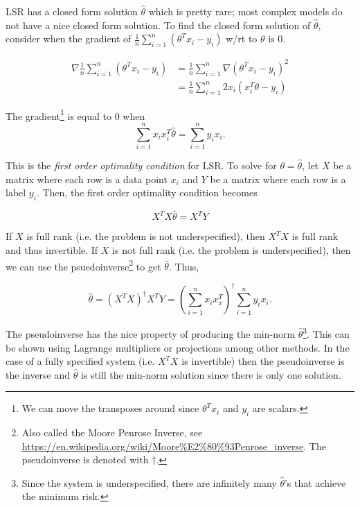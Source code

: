 LSR has a closed form solution $\hat{\theta}$ which is pretty rare; most complex models do not have a nice closed form solution. To find the closed form solution of $\hat{\theta}$, consider when the gradient of $\frac{1}{n}\sum_{i=1}^{n}(\theta^T x_i - y_i)$ w/rt to $\theta$ is 0.

\begin{align}
\nabla \frac{1}{n}\sum_{i=1}^{n}(\theta^T x_i - y_i) &= \frac{1}{n}\sum_{i=1}^{n} \nabla (\theta^T x_i - y_i)^2 \\
&= \frac{1}{n} \sum_{i=1}^{n} 2x_i(x_i^T \theta - y_i)
\end{align}

The gradient\footnote{We can move the transposes around since $\theta^Tx_i$ and $y_i$ are scalars.} is equal to 0 when 
$$\sum_{i=1}^{n} x_ix_i^T\hat{\theta} = \sum_{i=1}^n y_ix_i.$$

This is the \textit{first order optimality condition} for LSR. To solve for $\theta = \hat{\theta}$, let $X$ be a matrix where each row is a data point $x_i$ and $Y$ be a matrix where each row is a label $y_i$. Then, the first order optimality condition becomes

$$X^TX\hat{\theta} = X^T Y$$

If $X$ is full rank (i.e. the problem is not underspecified), then $X^TX$ is full rank and thus invertible. 
If $X$ is not full rank (i.e. the problem is underspecified), then we can use the psuedoinverse\footnote{Also called the Moore Penrose Inverse, see \url{https://en.wikipedia.org/wiki/Moore\%E2\%80\%93Penrose_inverse}. The pseudoinverse is denoted with $\dag$.} to get $\hat{\theta}$. Thus, 

$$\hat{\theta} = (X^TX)^{\dag}X^TY = (\sum_{i=1}^{n} x_i x_x^T)^{\dag} \sum_{i=1}^{n} y_ix_i.$$

The pseudoinverse has the nice property of producing the min-norm $\hat{\theta}$\footnote{Since the system is underspecified, there are infinitely many $\hat{\theta}$'s that achieve the minimum risk.}. This can be shown using Lagrange multipliers or projections among other methods. In the case of a fully specified system (i.e. $X^TX$ is invertible) then the pseudoinverse is the inverse and $\hat{\theta}$ is still the min-norm solution since there is only one solution.

